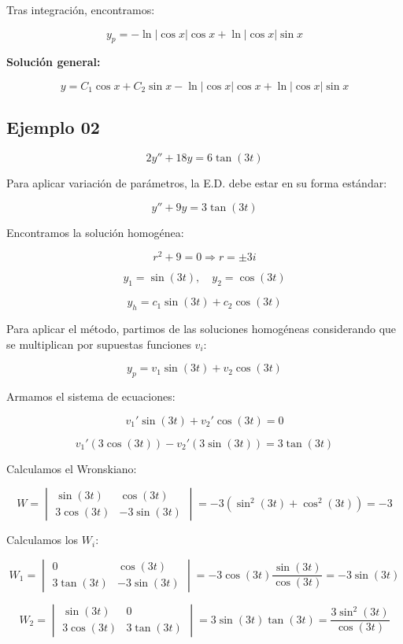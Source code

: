 Tras integración, encontramos:

\begin{equation}
y_p = -\ln |\cos x| \cos x + \ln |\cos x| \sin x
\end{equation}

\textbf{Solución general:}

\begin{equation}
y = C_1 \cos x + C_2 \sin x - \ln |\cos x| \cos x + \ln |\cos x| \sin x
\end{equation}


\subsection*{Ejemplo 02}

\[
2y'' + 18y = 6\tan(3t)
\]

Para aplicar variación de parámetros, la E.D. debe estar en su forma estándar:

\[
y'' + 9y = 3\tan(3t)
\]

Encontramos la solución homogénea:

\[
r^2 + 9 = 0 \Rightarrow r = \pm 3i
\]

\[
y_1 = \sin(3t), \quad y_2 = \cos(3t)
\]

\[
y_h = c_1 \sin(3t) + c_2 \cos(3t)
\]

Para aplicar el método, partimos de las soluciones homogéneas considerando que se multiplican por supuestas funciones \( v_i \):

\[
y_p = v_1 \sin(3t) + v_2 \cos(3t)
\]

Armamos el sistema de ecuaciones:

\[
v_1' \sin(3t) + v_2' \cos(3t) = 0
\]

\[
v_1' (3\cos(3t)) - v_2' (3\sin(3t)) = 3\tan(3t)
\]

Calculamos el Wronskiano:

\[
W =
\begin{vmatrix}
\sin(3t) & \cos(3t) \\
3\cos(3t) & -3\sin(3t)
\end{vmatrix}
= -3 (\sin^2(3t) + \cos^2(3t)) = -3
\]

Calculamos los \( W_i \):

\[
W_1 =
\begin{vmatrix}
0 & \cos(3t) \\
3\tan(3t) & -3\sin(3t)
\end{vmatrix}
= -3\cos(3t) \frac{\sin(3t)}{\cos(3t)} = -3\sin(3t)
\]

\[
W_2 =
\begin{vmatrix}
\sin(3t) & 0 \\
3\cos(3t) & 3\tan(3t)
\end{vmatrix}
= 3\sin(3t) \tan(3t) = \frac{3\sin^2(3t)}{\cos(3t)}
\]

